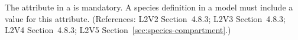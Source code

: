 The  attribute in a \Species is mandatory.  A species
definition in a model must include a value for this attribute.  (References:
L2V2 Section~4.8.3; L2V3 Section~4.8.3; L2V4 Section~4.8.3; L2V5 Section~\ref{sec:species-compartment}.)
